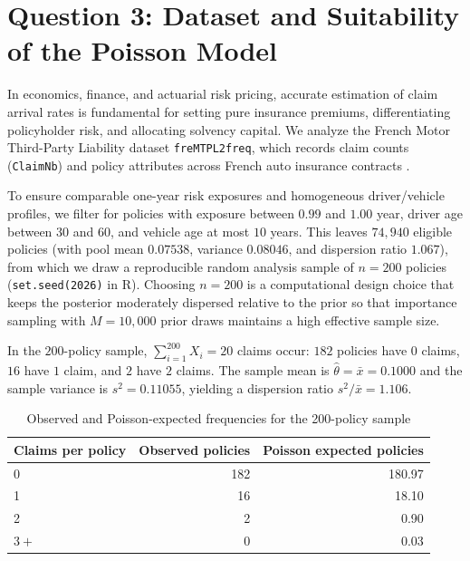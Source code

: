 \documentclass[11pt,a4paper]{article}
\begin{document}
\section*{Question 3: Dataset and Suitability of the Poisson Model}

In economics, finance, and actuarial risk pricing, accurate estimation of claim arrival rates is fundamental for setting pure insurance premiums, differentiating policyholder risk, and allocating solvency capital. We analyze the French Motor Third-Party Liability dataset \texttt{freMTPL2freq}, which records claim counts (\texttt{ClaimNb}) and policy attributes across French auto insurance contracts \cite{CASdatasets,HuggingFace}.

To ensure comparable one-year risk exposures and homogeneous driver/vehicle profiles, we filter for policies with exposure between $0.99$ and $1.00$ year, driver age between $30$ and $60$, and vehicle age at most $10$ years. This leaves $74{,}940$ eligible policies (with pool mean $0.07538$, variance $0.08046$, and dispersion ratio $1.067$), from which we draw a reproducible random analysis sample of $n = 200$ policies (\texttt{set.seed(2026)} in R). Choosing $n = 200$ is a computational design choice that keeps the posterior moderately dispersed relative to the prior so that importance sampling with $M = 10{,}000$ prior draws maintains a high effective sample size.

In the $200$-policy sample, $\sum_{i=1}^{200} X_i = 20$ claims occur: $182$ policies have $0$ claims, $16$ have $1$ claim, and $2$ have $2$ claims. The sample mean is $\hat{\theta} = \bar{x} = 0.1000$ and the sample variance is $s^2 = 0.11055$, yielding a dispersion ratio $s^2 / \bar{x} = 1.106$.

\begin{table}[ht]
\centering
\caption{Observed and Poisson-expected frequencies for the 200-policy sample}
\label{tab:claim_frequencies}
\begin{tabular}{lrr}
\toprule
Claims per policy & Observed policies & Poisson expected policies \\
\midrule
0 & 182 & 180.97 \\
1 & 16 & 18.10 \\
2 & 2 & 0.90 \\
$3+$ & 0 & 0.03 \\
\bottomrule
\end{tabular}
\end{table}
\end{document}
